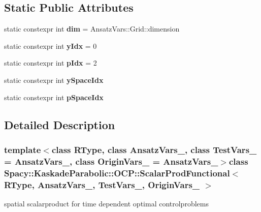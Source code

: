 \subsection*{Static Public Attributes}
\begin{DoxyCompactItemize}
\item 
\hypertarget{classSpacy_1_1KaskadeParabolic_1_1OCP_1_1ScalarProdFunctional_a2f7e48edad0cec2fdc4f7134c99e2b38}{static constexpr int {\bfseries dim} = Ansatz\-Vars\-::\-Grid\-::dimension}\label{classSpacy_1_1KaskadeParabolic_1_1OCP_1_1ScalarProdFunctional_a2f7e48edad0cec2fdc4f7134c99e2b38}

\item 
\hypertarget{classSpacy_1_1KaskadeParabolic_1_1OCP_1_1ScalarProdFunctional_ad4044bcef8d1d6180a85c04a5cf4abca}{static constexpr int {\bfseries y\-Idx} = 0}\label{classSpacy_1_1KaskadeParabolic_1_1OCP_1_1ScalarProdFunctional_ad4044bcef8d1d6180a85c04a5cf4abca}

\item 
\hypertarget{classSpacy_1_1KaskadeParabolic_1_1OCP_1_1ScalarProdFunctional_a8971fe0ed596ad5d4e5a38f97f341e01}{static constexpr int {\bfseries p\-Idx} = 2}\label{classSpacy_1_1KaskadeParabolic_1_1OCP_1_1ScalarProdFunctional_a8971fe0ed596ad5d4e5a38f97f341e01}

\item 
static constexpr int {\bfseries y\-Space\-Idx}
\item 
static constexpr int {\bfseries p\-Space\-Idx}
\end{DoxyCompactItemize}


\subsection{Detailed Description}
\subsubsection*{template$<$class R\-Type, class Ansatz\-Vars\-\_\-, class Test\-Vars\-\_\- = Ansatz\-Vars\-\_\-, class Origin\-Vars\-\_\- = Ansatz\-Vars\-\_\-$>$class Spacy\-::\-Kaskade\-Parabolic\-::\-O\-C\-P\-::\-Scalar\-Prod\-Functional$<$ R\-Type, Ansatz\-Vars\-\_\-, Test\-Vars\-\_\-, Origin\-Vars\-\_\- $>$}

spatial scalarproduct for time dependent optimal controlproblems 

